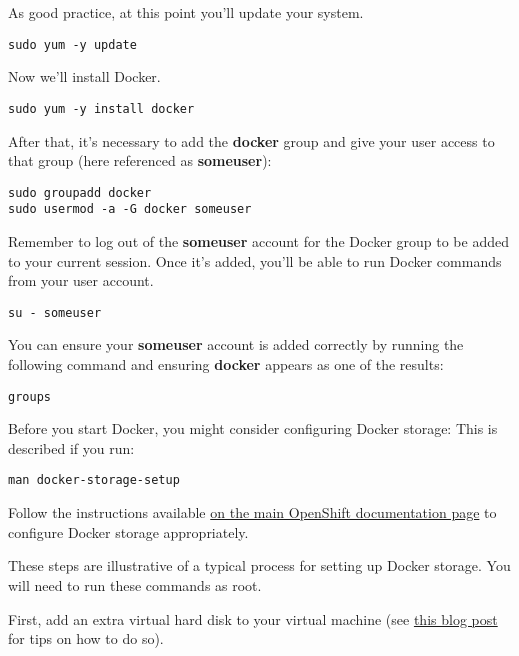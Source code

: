\documentclass[letterpaper,12pt]{article}
\begin{document}
As good practice, at this point you'll update your system.
\vspace{.75em}
\begin{lstlisting}
sudo yum -y update
\end{lstlisting}

Now we'll install Docker.
\vspace{.75em}
\begin{lstlisting}
sudo yum -y install docker
\end{lstlisting}

After that, it's necessary to add the \textbf{docker} group and give your user access to that group (here referenced as \textbf{someuser}):
\vspace{.75em}
\begin{lstlisting}
sudo groupadd docker
sudo usermod -a -G docker someuser
\end{lstlisting}

Remember to log out of the \textbf{someuser} account for the Docker group to be added to your current session. Once it's added, you'll be able to run Docker commands from your user account.
\vspace{.75em}
\begin{lstlisting}
su - someuser
\end{lstlisting}

You can ensure your \textbf{someuser} account is added correctly by running the following command and ensuring \textbf{docker} appears as one of the results:
\vspace{.75em}
\begin{lstlisting}
groups
\end{lstlisting}

Before you start Docker, you might consider configuring Docker storage: This is described if you run:
\vspace{.75em}
\begin{lstlisting}
man docker-storage-setup
\end{lstlisting}

Follow the instructions available \href{https://docs.openshift.com/container-platform/3.4/install\_config/install/host\_preparation.html\#configuring-docker-storage}{on the main OpenShift documentation page} to configure Docker storage appropriately.

These steps are illustrative of a typical process for setting up Docker storage. You will need to run these commands as root.

First, add an extra virtual hard disk to your virtual machine (see \href{http://catlingmindswipe.blogspot.com/2012/02/how-to-create-new-virtual-disks-in.html}{this blog post} for tips on how to do so).
\end{document}
